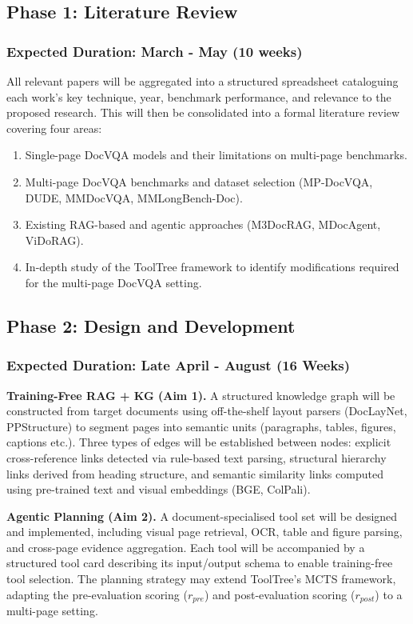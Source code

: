 \documentclass[12pt, a4paper]{article}
\begin{document}
\subsection*{Phase 1: Literature Review}
\subsubsection*{Expected Duration: March - May (10 weeks)}
All relevant papers will be aggregated into a structured spreadsheet cataloguing each work's key technique, year, benchmark performance, and relevance to the proposed research. This will then be consolidated into a formal literature review covering four areas:
\begin{enumerate}
    \item Single-page DocVQA models and their limitations on multi-page benchmarks.
    \item Multi-page DocVQA benchmarks and dataset selection (MP-DocVQA, DUDE, MMDocVQA, MMLongBench-Doc).
    \item Existing RAG-based and agentic approaches (M3DocRAG, MDocAgent, ViDoRAG).
    \item In-depth study of the ToolTree framework \cite{ToolTree} to identify modifications required for the multi-page DocVQA setting.
\end{enumerate}

\subsection*{Phase 2: Design and Development}
\subsubsection*{Expected Duration: Late April - August (16 Weeks)}

\textbf{Training-Free RAG + KG (Aim 1).} A structured knowledge graph will be constructed from target documents using off-the-shelf layout parsers (DocLayNet, PPStructure) to segment pages into semantic units (paragraphs, tables, figures, captions etc.). Three types of edges will be established between nodes: explicit cross-reference links detected via rule-based text parsing, structural hierarchy links derived from heading structure, and semantic similarity links computed using pre-trained text and visual embeddings (BGE, ColPali). 

\textbf{Agentic Planning (Aim 2).} A document-specialised tool set will be designed and implemented, including visual page retrieval, OCR, table and figure parsing, and cross-page evidence aggregation. Each tool will be accompanied by a structured tool card describing its input/output schema to enable training-free tool selection. The planning strategy may extend ToolTree's \cite{ToolTree} MCTS framework, adapting the pre-evaluation scoring ($r_{pre}$) and post-evaluation scoring ($r_{post}$) to a multi-page setting.
\end{document}
